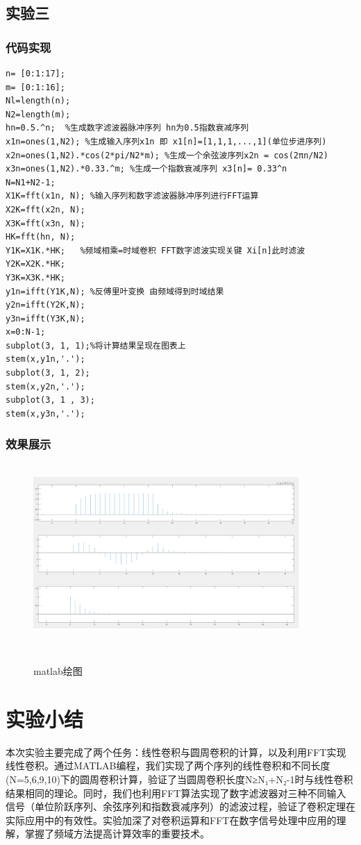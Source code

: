 \documentclass[12pt,hyperref,a4paper,UTF8]{ctexart}
\begin{document}
\subsection{实验三}

\subsubsection{代码实现}
\begin{lstlisting}[style=matlab, caption={实验三MATLAB实现代码}]
n= [0:1:17];
m= [0:1:16];
Nl=length(n);
N2=length(m);
hn=0.5.^n;  %生成数字滤波器脉冲序列 hn为0.5指数衰减序列
x1n=ones(1,N2); %生成输入序列x1n 即 x1[n]=[1,1,1,...,1](单位步进序列)
x2n=ones(1,N2).*cos(2*pi/N2*m); %生成一个余弦波序列x2n = cos(2πn/N2)
x3n=ones(1,N2).*0.33.^m; %生成一个指数衰减序列 x3[n]= 0.33^n
N=N1+N2-1;
X1K=fft(x1n, N); %输入序列和数字滤波器脉冲序列进行FFT运算
X2K=fft(x2n, N);
X3K=fft(x3n, N);
HK=fft(hn, N);
Y1K=X1K.*HK;   %频域相乘=时域卷积 FFT数字滤波实现关键 Xi[n]此时滤波
Y2K=X2K.*HK;
Y3K=X3K.*HK;
y1n=ifft(Y1K,N); %反傅里叶变换 由频域得到时域结果
y2n=ifft(Y2K,N);
y3n=ifft(Y3K,N);
x=0:N-1;
subplot(3, 1, 1);%将计算结果呈现在图表上
stem(x,y1n,'.');
subplot(3, 1, 2);
stem(x,y2n,'.');
subplot(3, 1 , 3);
stem(x,y3n,'.');
\end{lstlisting}
\subsubsection{效果展示}


\begin{figure}[H] %
        \centering
        \includegraphics[width=0.9\textwidth]{figures/302.png} %
        \caption{matlab绘图} %
        \label{fig:example} %
\end{figure}

\section{实验小结}
本次实验主要完成了两个任务：线性卷积与圆周卷积的计算，以及利用FFT实现线性卷积。通过MATLAB编程，我们实现了两个序列的线性卷积和不同长度(N=5,6,9,10)下的圆周卷积计算，验证了当圆周卷积长度N≥N₁+N₂-1时与线性卷积结果相同的理论。同时，我们也利用FFT算法实现了数字滤波器对三种不同输入信号（单位阶跃序列、余弦序列和指数衰减序列）的滤波过程，验证了卷积定理在实际应用中的有效性。实验加深了对卷积运算和FFT在数字信号处理中应用的理解，掌握了频域方法提高计算效率的重要技术。
\end{document}
